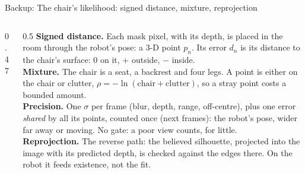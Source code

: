 \documentclass[10pt, aspectratio=169]{beamer}
\newcommand{\chairside}[5]{
  \draw[#5, line join=round, line cap=round] ($(#1)+(-0.14,#3+#4)$) -- ($(#1)+(0,#3)$) -- ($(#1)+(#2,#3)$) -- ($(#1)+(#2+0.08,0)$);
  \draw[#5, line cap=round] ($(#1)+(0,#3)$) -- ($(#1)+(-0.1,0)$);
}
\begin{document}
\begin{frame}{Backup: The chair's likelihood: signed distance, mixture, reprojection}
  \begin{columns}[c]
    \begin{column}{0.47\textwidth}
      \centering
    \end{column}
    \begin{column}{0.5\textwidth}
      \footnotesize
      \textbf{Signed distance.} Each mask pixel, with its depth, is placed in the room through the
      robot's pose: a 3-D point $p_n$. Its error $d_n$ is its distance to the chair's surface:
      $0$ on it, $+$ outside, $-$ inside.\\[0.3em]
      \textbf{Mixture.} The chair is a seat, a backrest and four legs. A point is either on the chair
      or clutter, $\rho=-\ln(\text{chair}+\text{clutter})$, so a stray point costs a bounded amount.\\[0.3em]
      \textbf{Precision.} One $\sigma$ per frame (blur, depth, range, off-centre), plus one error
      \emph{shared} by all its points, counted once (next frames): the robot's pose, wider far away or
      moving. No gate: a poor view counts, for little.\\[0.3em]
      \textbf{Reprojection.} The reverse path: the believed silhouette, projected into the image with its
      predicted depth, is checked against the edges there. \alert{On the robot it feeds existence, not the fit.}
    \end{column}
  \end{columns}
\end{frame}
\end{document}
